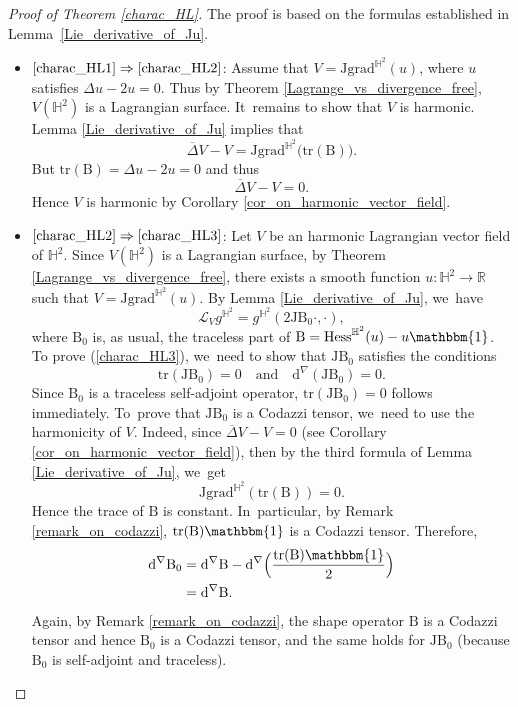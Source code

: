 \documentclass[10pt]{amsart}
\theoremstyle{plain}
\theoremstyle{definition}
\newcommand{\grad}{\mathrm{grad}^{\mathbb{H}^2}}
\newcommand{\hess}{\mathrm{Hess}^{\mathbb{H}^2}}
\newcommand{\J}{\mathrm{J}}
\newcommand{\B}{\mathrm{B}}
\begin{document}
\pagebreak[2]
\begin{proof}[Proof of Theorem \ref{charac_HL}]
The proof is based on the formulas established in Lem\-ma~\ref{Lie_derivative_of_Ju}.

\begin{itemize}
\item
$\eqref{charac_HL1}\Rightarrow\eqref{charac_HL2}$: Assume that \(V = \J \grad(u) \), where \(u \) satisfies \(\Delta u - 2u = 0\). Thus by Theorem \ref{Lagrange_vs_divergence_free}, \(V(\mathbb{H}^2) \) is a Lagrangian surface. It~remains to show that \(V \) is harmonic. Lemma \ref{Lie_derivative_of_Ju} implies that
\[\overline{\Delta} V - V = \J \grad\bigl(\mathrm{tr}(\B)\bigr).\]
But \(\mathrm{tr}(\B) = \Delta u - 2u = 0\) and thus
\[\overline{\Delta} V - V = 0.\]
Hence \(V \) is harmonic by Corollary \ref{cor_on_harmonic_vector_field}.

\item
$\eqref{charac_HL2}\Rightarrow\eqref{charac_HL3}$: Let $V$ be an harmonic Lagrangian vector field of $\mathbb{H}^2$. Since $V(\mathbb{H}^2)$ is a Lagrangian surface, by Theorem \ref{Lagrange_vs_divergence_free}, there exists a smooth function $u:\mathbb{H}^2 \to \mathbb{R}$ such that $V = \J\grad(u)$. By Lemma \ref{Lie_derivative_of_Ju}, we~have
\[ \mathcal{L}_Vg^{\mathbb{H}^2} = g^{\mathbb{H}^2}(2\J\B_0 \cdot, \cdot), \]
where $\B_0$ is, as usual, the traceless part of $\B = \hess(u) - u\mathbbm{1}$. To prove (\ref{charac_HL3}), we~need to show that $\J\B_0$ satisfies the conditions
\[
\mathrm{tr}(\J\B_0) = 0 \quad \text{and} \quad \mathrm{d}^{\nabla}(\J\B_0) = 0.
\]
Since $\B_0$ is a traceless self-adjoint operator, $\mathrm{tr}(\J\B_0) = 0$ follows immediately. To~prove that $\J\B_0$ is a Codazzi tensor, we~need to use the harmonicity of $V$. Indeed, since $\overline{\Delta}V - V = 0$ (see Corollary \ref{cor_on_harmonic_vector_field}), then by the third formula of Lemma \ref{Lie_derivative_of_Ju}, we~get
\[ \J\grad\left(\mathrm{tr}(\B)\right) = 0. \]
Hence the trace of $\B$ is constant. In~particular, by Remark \ref{remark_on_codazzi}, $\mathrm{tr}(\B)\mathbbm{1}$ is a Codazzi tensor. Therefore,
\begin{align*}
\mathrm{d}^{\nabla}\B_0 &= \mathrm{d}^{\nabla}\B - \mathrm{d}^{\nabla}\Bigl(\frac{\mathrm{tr}(\B)\mathbbm{1}}{2} \Bigr) \\
&= \mathrm{d}^{\nabla}\B.
\end{align*}
Again, by Remark \ref{remark_on_codazzi}, the shape operator $\B$ is a Codazzi tensor and hence $\B_0$ is a Codazzi tensor, and the same holds for $\J\B_0$ (because $\B_0$ is self-adjoint and traceless).


\end{itemize}
\end{proof}
\end{document}
